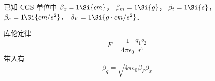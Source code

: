 
已知 CGS 单位中 $\beta_x = 1\Si{cm}$， $\beta_m = 1\Si{g}$， $\beta_t = 1\Si{s}$， $\beta_a = 1\Si{cm/s^2}$， $\beta_F = 1\Si{g \cdot cm/s^2}$．

库伦定律
\begin{equation}
F = \frac{1}{4\pi\epsilon_0}\frac{q_1 q_2}{r^2}
\end{equation}
带入有
\begin{equation}
\beta_q = \sqrt{4\pi\epsilon_0\beta_F} \beta_x
\end{equation}
